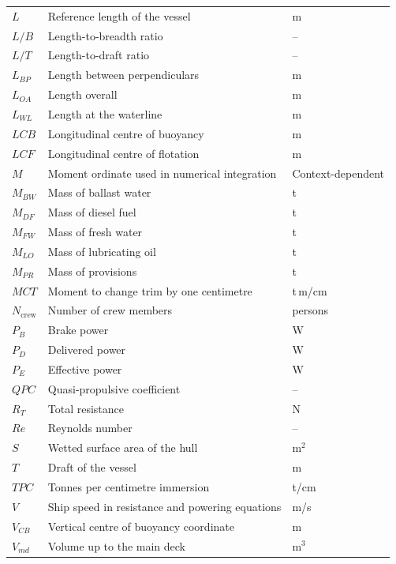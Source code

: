 \begin{appendices}
\begin{longtable}{@{}p{}
                      p{}
                      p{}@{}}
$L$ & Reference length of the vessel & m \\
$L/B$ & Length-to-breadth ratio & -- \\
$L/T$ & Length-to-draft ratio & -- \\
$L_{BP}$ & Length between perpendiculars & m \\
$L_{OA}$ & Length overall & m \\
$L_{WL}$ & Length at the waterline & m \\

$LCB$ & Longitudinal centre of buoyancy & m \\
$LCF$ & Longitudinal centre of flotation & m \\

$M$ & Moment ordinate used in numerical integration & Context-dependent \\
$M_{BW}$ & Mass of ballast water & t \\
$M_{DF}$ & Mass of diesel fuel & t \\
$M_{FW}$ & Mass of fresh water & t \\
$M_{LO}$ & Mass of lubricating oil & t \\
$M_{PR}$ & Mass of provisions & t \\
$MCT$ & Moment to change trim by one centimetre & t\,m/cm \\

$N_{\mathrm{crew}}$ & Number of crew members & persons \\

$P_B$ & Brake power & W \\
$P_D$ & Delivered power & W \\
$P_E$ & Effective power & W \\

$QPC$ & Quasi-propulsive coefficient & -- \\

$R_T$ & Total resistance & N \\
$Re$ & Reynolds number & -- \\

$S$ & Wetted surface area of the hull & m$^2$ \\

$T$ & Draft of the vessel & m \\
$TPC$ & Tonnes per centimetre immersion & t/cm \\

$V$ & Ship speed in resistance and powering equations & m/s \\
$V_{CB}$ & Vertical centre of buoyancy coordinate & m \\
$V_{md}$ & Volume up to the main deck & m$^3$ \\


\end{longtable}
\end{appendices}
